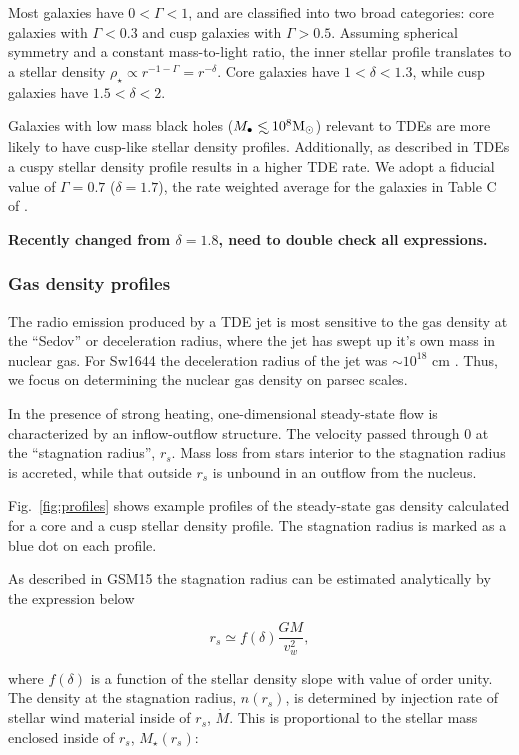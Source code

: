 \documentclass[usenatbib,fleqn]{mnras}
\newcommand\lsim{\mathrel{\rlap{\lower4pt\hbox{\hskip1pt$\sim$}}
    \raise1pt\hbox{$<$}}}
\newcommand{\Mbh}[1][]{M_{\bullet#1}}
\newcommand{\Msun}{{\rm M_\odot}}
\newcommand{\rs}{r_s}
\begin{document}
Most galaxies have $0<\Gamma<1$, and are classified into two broad
categories: core galaxies with $\Gamma<0.3$ and cusp galaxies with
$\Gamma>0.5$. Assuming spherical symmetry and a constant mass-to-light
ratio, the inner stellar profile translates to a stellar density
$\rho_\star\propto r^{-1-\Gamma}=r^{-\delta}$. Core galaxies have
$1<\delta<1.3$, while cusp galaxies have $1.5<\delta<2$.

Galaxies with low mass black holes ($\Mbh\lsim 10^{8} \Msun$) relevant
to TDEs are more likely to have cusp-like stellar density
profiles. Additionally, as described in \citet{Stone&Metzger2016} TDEs
a cuspy stellar density profile results in a higher TDE rate. We adopt
a fiducial value of $\Gamma=0.7$ ($\delta=1.7$), the rate weighted
average for the galaxies in Table C of \citet{Stone&Metzger2016}.

 {\bf Recently changed from $\delta=1.8$, need to
  double check all expressions.}

\subsubsection{Gas density profiles}
The radio emission produced by a TDE jet is most sensitive to the gas
density at the ``Sedov'' or deceleration radius, where the jet has
swept up it's own mass in nuclear gas. For Sw1644 the deceleration
radius of the jet was $\sim 10^{18}$ cm \citep{Mimica+2015}. Thus, we
focus on determining the nuclear gas density on parsec scales.

In the presence of strong heating, one-dimensional steady-state flow
is characterized by an inflow-outflow structure. The velocity passed
through 0 at the ``stagnation radius'', $\rs$.  Mass loss from stars
interior to the stagnation radius is accreted, while that outside
$\rs$ is unbound in an outflow from the nucleus. 

Fig.~\ref{fig:profiles} shows example profiles of the steady-state gas
density calculated for a core and a cusp stellar density profile. The
stagnation radius is marked as a blue dot on each profile.

As described in GSM15 the stagnation radius can be estimated
analytically by the expression below

\begin{equation}
r_s \simeq f(\delta) \frac{G M}{v_w^2},
\label{eq:rs}
\end{equation}


\noindent where $f(\delta)$ is a function of the stellar density slope with
value of order unity.  The density at the stagnation radius, $n(\rs)$,
is determined by injection rate of stellar wind material inside of
$\rs$, $\dot{M}$. This is proportional to the stellar mass enclosed
inside of $\rs$, $M_{\star}(\rs)$:
\end{document}
